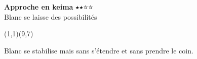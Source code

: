 \documentclass[preview, border=0pt, varwidth=false]{standalone}
\begin{document}
	\setgounit{0.6cm} 
	
\parbox[c][14.65cm][c]{10.2cm}{
	\centering
	
	{\Large\textbf{Approche en keima} $\medblackstar \medblackstar \medwhitestar \medwhitestar$ \\ Blanc se laisse des possibilités }
	\vspace{3em}
	
	\begin{psgopartialboard}{(1,1)(9,7)}
		\pass
	\end{psgopartialboard}
	
	\vspace{1em}
	Blanc se stabilise mais sans s'étendre et sans prendre le coin.
}
\end{document}
